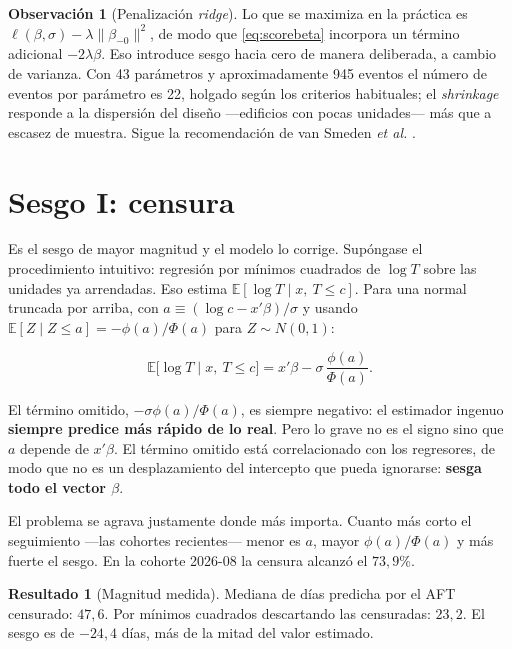 \documentclass[11pt,a4paper]{article}
\theoremstyle{definition}
\newtheorem{resultado}{Resultado}
\newtheorem{observacion}{Observación}
\newcommand{\E}{\mathbb{E}}
\begin{document}
\begin{observacion}[Penalización \emph{ridge}]
Lo que se maximiza en la práctica es $\ell(\beta,\sigma)-\lambda\|\beta_{-0}\|^2$,
de modo que \eqref{eq:scorebeta} incorpora un término adicional $-2\lambda\beta$.
Eso introduce sesgo hacia cero de manera deliberada, a cambio de varianza. Con 43
parámetros y aproximadamente 945 eventos el número de eventos por parámetro es
22, holgado según los criterios habituales; el \emph{shrinkage} responde a la
dispersión del diseño ---edificios con pocas unidades--- más que a escasez de
muestra. Sigue la recomendación de van Smeden \emph{et al.} \cite{vansmeden2019}.
\end{observacion}

\section{Sesgo I: censura}

Es el sesgo de mayor magnitud y el modelo lo corrige. Supóngase el procedimiento
intuitivo: regresión por mínimos cuadrados de $\log T$ sobre las unidades ya
arrendadas. Eso estima $\E[\log T\mid x,\ T\le c]$. Para una normal truncada por
arriba, con $a\equiv(\log c-x'\beta)/\sigma$ y usando
$\E[Z\mid Z\le a]=-\phi(a)/\Phi(a)$ para $Z\sim N(0,1)$:

\begin{equation}
\E\bigl[\log T \mid x,\ T\le c\bigr]
= x'\beta-\sigma\,\frac{\phi(a)}{\Phi(a)}.
\label{eq:truncada}
\end{equation}

El término omitido, $-\sigma\phi(a)/\Phi(a)$, es siempre negativo: el estimador
ingenuo \textbf{siempre predice más rápido de lo real}. Pero lo grave no es el
signo sino que $a$ depende de $x'\beta$. El término omitido está correlacionado
con los regresores, de modo que no es un desplazamiento del intercepto que pueda
ignorarse: \textbf{sesga todo el vector $\beta$}.

El problema se agrava justamente donde más importa. Cuanto más corto el
seguimiento ---las cohortes recientes--- menor es $a$, mayor $\phi(a)/\Phi(a)$ y
más fuerte el sesgo. En la cohorte 2026-08 la censura alcanzó el $73{,}9\%$.

\begin{resultado}[Magnitud medida]
Mediana de días predicha por el AFT censurado: $47{,}6$. Por mínimos cuadrados
descartando las censuradas: $23{,}2$. El sesgo es de $-24{,}4$ días, más de la
mitad del valor estimado.
\end{resultado}
\end{document}
